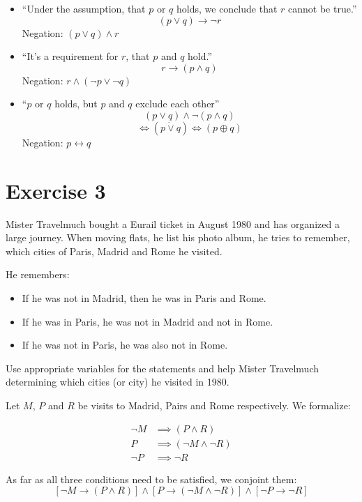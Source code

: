 \documentclass[a4paper]{article}
\theoremstyle{definition}
\begin{document}
\begin{itemize}
  \item \enquote{Under the assumption, that $p$ or $q$ holds, we conclude that $r$ cannot be true.}
    \[ (p \lor q) \rightarrow \neg r \]
    Negation: $(p \lor q) \land r$
  \item \enquote{It's a requirement for $r$, that $p$ and $q$ hold.}
    \[ r \rightarrow (p \land q) \]
    Negation: $r \land (\neg p \lor \neg q)$
  \item \enquote{$p$ or $q$ holds, but $p$ and $q$ exclude each other}
    \[ (p \lor q) \land \neg (p \land q) \]
    \[ \Leftrightarrow (p \dot\lor q) \Leftrightarrow (p \oplus q) \]
    Negation: $p \leftrightarrow q$
\end{itemize}

\section{Exercise 3}
\begin{ex}
  Mister Travelmuch bought a Eurail ticket in August 1980 and has organized a large journey.
  When moving flats, he list his photo album, he tries to remember,
  which cities of Paris, Madrid and Rome he visited.

  He remembers:
  \begin{itemize}
    \item If he was not in Madrid, then he was in Paris and Rome.
    \item If he was in Paris, he was not in Madrid and not in Rome.
    \item If he was not in Paris, he was also not in Rome.
  \end{itemize}

  Use appropriate variables for the statements and help Mister Travelmuch
  determining which cities (or city) he visited in 1980.
\end{ex}

Let $M$, $P$ and $R$ be visits to Madrid, Pairs and Rome respectively.
We formalize:

\begin{align*}
  \neg M &\implies (P \land R) \\
       P &\implies (\neg M \land \neg R) \\
  \neg P &\implies \neg R
\end{align*}

As far as all three conditions need to be satisfied, we conjoint them:
\[
    \left[\neg M \rightarrow (P \land R)\right] \land
    \left[P \rightarrow (\neg M \land \neg R)\right] \land
    \left[\neg P \rightarrow \neg R\right]
\]
\end{document}
